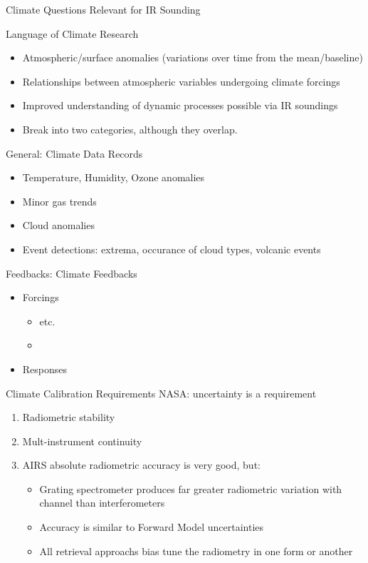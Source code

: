 \documentclass[presentation]{beamer}
\begin{document}
\begin{frame}[label={sec:org0ad05f2}]{Climate Questions Relevant for IR Sounding}
\begin{block}{Language of Climate Research}
\begin{itemize}
\item Atmospheric/surface anomalies (variations over time from the mean/baseline)
\item Relationships between atmospheric variables undergoing climate forcings
\item Improved understanding of dynamic processes possible via IR soundings

\item Break into two categories, although they overlap.
\end{itemize}
\end{block}

\begin{block}{General: Climate Data Records}
\begin{itemize}
\item Temperature, Humidity, Ozone anomalies
\item Minor gas trends
\item Cloud anomalies
\item Event detections: extrema, occurance of cloud types, volcanic events
\end{itemize}
\end{block}

\begin{block}{Feedbacks: Climate Feedbacks}
\begin{itemize}
\item Forcings
\begin{itemize}
\item \cd etc.
\item 
\end{itemize}
\item Responses
\end{itemize}
\end{block}
\end{frame}

\begin{frame}[label={sec:orgc6f3c8d}]{Climate Calibration Requirements}
NASA: uncertainty is a requirement

\begin{enumerate}
\item Radiometric stability
\item Mult-instrument continuity

\item AIRS absolute radiometric accuracy is very good, but:
\begin{itemize}
\item Grating spectrometer produces far greater radiometric variation with channel than interferometers
\item Accuracy is similar to Forward Model uncertainties
\item All retrieval approachs bias tune the radiometry in one form or another
\end{itemize}
\end{enumerate}
\end{frame}
\end{document}
